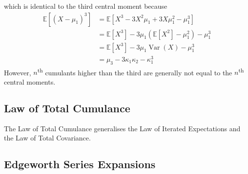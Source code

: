 \documentclass[11pt]{report} %
\begin{document}
which is identical to the third central moment because
\begin{align}
\mathbb{E}\left[\left(X - \mu_{1}\right)^{3}\right] &= \mathbb{E}\left[X^{3} - 3X^{2}\mu_{1} + 3X\mu_{1}^{2} - \mu_{1}^{3}\right] \\
&= \mathbb{E}\left[X^{3}\right] - 3\mu_{1}\left(\mathbb{E}\left[X^{2}\right] - \mu_{1}^{2}\right) - \mu_{1}^{3} \\
&= \mathbb{E}\left[X^{3}\right] - 3\mu_{1}\operatorname{Var}\left(X\right) - \mu_{1}^{3} \\
&= \mu_{3} - 3\kappa_{1}\kappa_{2} - \kappa_{1}^{3}
\end{align}
However, $n$\textsuperscript{th} cumulants higher than the third are generally not equal to the $n$\textsuperscript{th} central moments.

\subsection{Law of Total Cumulance}

The Law of Total Cumulance generalises the Law of Iterated Expectations and the Law of Total Covariance.

\subsection{Edgeworth Series Expansions}
\end{document}
